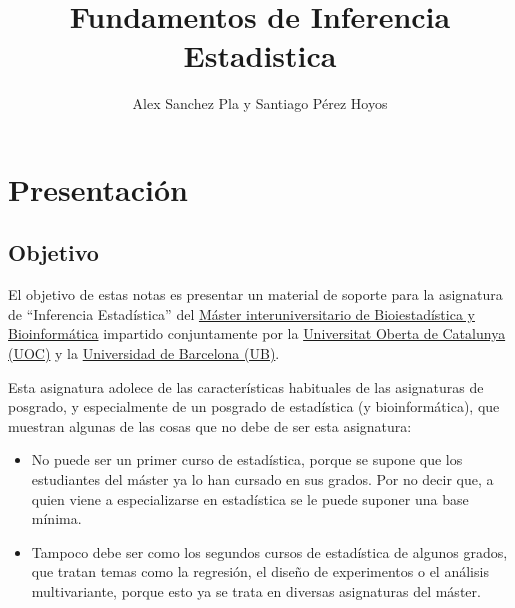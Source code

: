 \documentclass[
  a4paper,
  DIV=11,
  numbers=noendperiod]{scrreprt}
\title{Fundamentos de Inferencia Estadistica}
\author{Alex Sanchez Pla y Santiago Pérez Hoyos}
\date{}
\providecommand{\tightlist}{%
  \setlength{\itemsep}{0pt}\setlength{\parskip}{0pt}}\usepackage{longtable,booktabs,array}
\renewcommand*\contentsname{Table of contents}
\newcommand\contentsname{Table of contents}
\begin{document}
\maketitle

\renewcommand*\contentsname{Table of contents}
{
\hypersetup{linkcolor=}
\setcounter{tocdepth}{2}
\tableofcontents
}


\chapter*{Presentación}\label{presentaciuxf3n}


\section*{Objetivo}\label{objetivo}


El objetivo de estas notas es presentar un material de soporte para la
asignatura de ``Inferencia Estadística'' del
\href{https://www.uoc.edu/es/estudios/masters/master-universitario-bioinformatica-bioestadistica}{Máster
interuniversitario de Bioiestadística y Bioinformática} impartido
conjuntamente por la \href{https://www.uoc.edu}{Universitat Oberta de
Catalunya (UOC)} y la \href{https://www.ub.edu}{Universidad de Barcelona
(UB)}.

Esta asignatura adolece de las características habituales de las
asignaturas de posgrado, y especialmente de un posgrado de estadística
(y bioinformática), que muestran algunas de las cosas que no debe de ser
esta asignatura:

\begin{itemize}
\tightlist
\item
  No puede ser un primer curso de estadística, porque se supone que los
  estudiantes del máster ya lo han cursado en sus grados. Por no decir
  que, a quien viene a especializarse en estadística se le puede suponer
  una base mínima.
\item
  Tampoco debe ser como los segundos cursos de estadística de algunos
  grados, que tratan temas como la regresión, el diseño de experimentos
  o el análisis multivariante, porque esto ya se trata en diversas
  asignaturas del máster.
\end{itemize}
\end{document}
